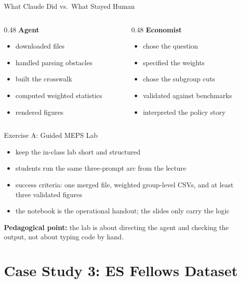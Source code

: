 \documentclass[10pt,english,aspectratio=169]{beamer}
\begin{document}
\begin{frame}{What Claude Did vs.\ What Stayed Human}
\begin{columns}[T]
\begin{column}{0.48\textwidth}
\textbf{Agent}
\begin{itemize}
    \item downloaded files
    \item handled parsing obstacles
    \item built the crosswalk
    \item computed weighted statistics
    \item rendered figures
\end{itemize}
\end{column}
\begin{column}{0.48\textwidth}
\textbf{Economist}
\begin{itemize}
    \item chose the question
    \item specified the weights
    \item chose the subgroup cuts
    \item validated against benchmarks
    \item interpreted the policy story
\end{itemize}
\end{column}
\end{columns}
\end{frame}

\begin{frame}{Exercise A: Guided MEPS Lab}
\begin{itemize}
    \item keep the in-class lab short and structured
    \item students run the same three-prompt arc from the lecture
    \item success criteria:
    one merged file, weighted group-level CSVs, and at least three validated figures
    \item the notebook is the operational handout; the slides only carry the logic
\end{itemize}

\vspace{0.3cm}
\textbf{Pedagogical point:} the lab is about directing the agent and checking the output, not about typing code by hand.
\end{frame}

\section{Case Study 3: ES Fellows Dataset}
\end{document}
